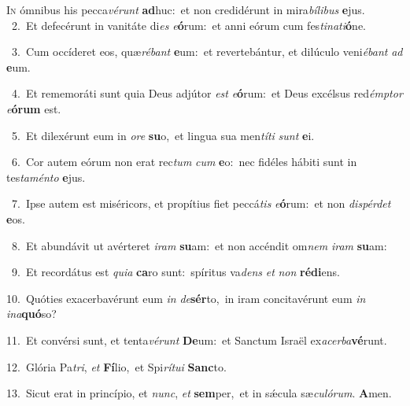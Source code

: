 \lettrine{\initial\textcolor{\initialcolor}{I}}{n} ómnibus his pecca\-\textit{vé}\-\textit{runt} \textbf{ad}\-huc:~\star et non credidérunt in mira\-\textit{bí}\-\textit{li}\textit{bus} \textbf{e}\-jus.\\
{\numbfont\textcolor{\numbcolor}{~2.}}~Et defecérunt in vanitáte di\textit{es} \textit{e}\-\textbf{ó}rum:~\star et anni eórum cum fes\-\textit{ti}\-\textit{na}\textit{ti}\textbf{ó}ne.\par
{\numbfont\textcolor{\numbcolor}{~3.}}~Cum occíderet eos, quæ\-\textit{ré}\-\textit{bant} \textbf{e}\-um:~\star et revertebántur, et dilúculo veni\-\textit{é}\-\textit{bant} \textit{ad} \textbf{e}\-um.\par
{\numbfont\textcolor{\numbcolor}{~4.}}~Et rememoráti sunt quia Deus adjútor \textit{est} \textit{e}\-\textbf{ó}rum:~\star et Deus excélsus red\-\textit{émp}\-\textit{tor} \textit{e}\-\textbf{ó}\textbf{rum} est.\par
{\numbfont\textcolor{\numbcolor}{~5.}}~Et dilexérunt eum in \textit{o}\-\textit{re} \textbf{su}\-o,~\star et lingua sua men\-\textit{tí}\-\textit{ti} \textit{sunt} \textbf{e}\-i.\par
{\numbfont\textcolor{\numbcolor}{~6.}}~Cor autem eórum non erat rec\textit{tum} \textit{cum} \textbf{e}\-o:~\star nec fidéles hábiti sunt in tes\-\textit{ta}\-\textit{mén}\textit{to} \textbf{e}\-jus.\par
{\numbfont\textcolor{\numbcolor}{~7.}}~Ipse autem est miséricors, et propítius fiet peccá\textit{tis} \textit{e}\-\textbf{ó}rum:~\star et non \textit{dis}\-\textit{pér}\textit{det} \textbf{e}\-os.\par
{\numbfont\textcolor{\numbcolor}{~8.}}~Et abundávit ut avérteret \textit{i}\-\textit{ram} \textbf{su}\-am:~\star et non accéndit om\textit{nem} \textit{i}\-\textit{ram} \textbf{su}\-am:\par
{\numbfont\textcolor{\numbcolor}{~9.}}~Et recordátus est \textit{qui}\-\textit{a} \textbf{ca}\-ro sunt:~\star spíritus va\textit{dens} \textit{et} \textit{non} \textbf{réd}\-\textbf{i}ens.\par
{\numbfont\textcolor{\numbcolor}{10.}}~Quóties exacerbavérunt eum \textit{in} \textit{de}\-\textbf{sér}to,~\star in iram concitavérunt eum \textit{in} \textit{in}\-\textit{a}\textbf{quó}so?\par
{\numbfont\textcolor{\numbcolor}{11.}}~Et convérsi sunt, et tenta\-\textit{vé}\-\textit{runt} \textbf{De}\-um:~\star et Sanctum Israël ex\-\textit{a}\-\textit{cer}\textit{ba}\textbf{vé}runt.\par
{\numbfont\textcolor{\numbcolor}{12.}}~Glória Pa\-\textit{tri}\-, \textit{et} \textbf{Fí}\-lio,~\star et Spi\-\textit{rí}\-\textit{tu}\textit{i} \textbf{Sanc}\-to.\par
{\numbfont\textcolor{\numbcolor}{13.}}~Sicut erat in princípio, et \textit{nunc}\-, \textit{et} \textbf{sem}\-per,~\star et in sǽcula sæ\-\textit{cu}\-\textit{ló}\textit{rum}. \textbf{A}\-men.\par
